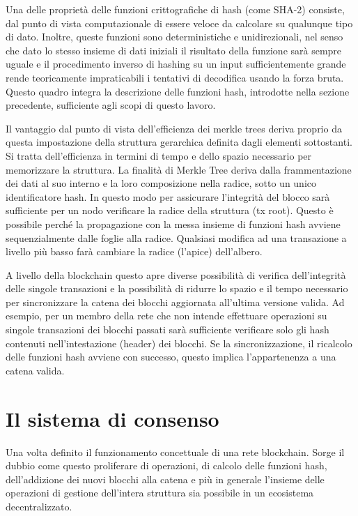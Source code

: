 Una delle proprietà delle funzioni crittografiche di hash (come SHA-2) consiste, dal punto di vista computazionale di essere veloce da calcolare su qualunque tipo di dato. Inoltre, queste funzioni sono deterministiche e unidirezionali, nel senso che dato lo stesso insieme di dati iniziali il risultato della funzione sarà sempre uguale e il procedimento inverso di hashing su un input sufficientemente grande rende teoricamente impraticabili i tentativi di decodifica usando la forza bruta. Questo quadro integra la descrizione delle funzioni hash, introdotte nella sezione precedente, sufficiente agli scopi di questo lavoro.
 
Il vantaggio dal punto di vista dell'efficienza dei merkle trees deriva proprio da questa impostazione della struttura gerarchica definita dagli elementi sottostanti. Si tratta dell'efficienza in termini di tempo e dello spazio necessario per memorizzare la struttura. La finalità di Merkle Tree deriva dalla frammentazione dei dati al suo interno e la loro composizione nella radice, sotto un unico identificatore hash. In questo modo per assicurare l'integrità del blocco sarà sufficiente per un nodo verificare la radice della struttura (tx root). Questo è possibile perché la propagazione con la messa insieme di funzioni hash avviene sequenzialmente dalle foglie alla radice. Qualsiasi modifica ad una transazione a livello più basso farà cambiare la radice (l'apice) dell'albero. 

A livello della blockchain questo apre diverse possibilità di verifica dell'integrità delle singole transazioni e la possibilità di ridurre lo spazio e il tempo necessario per sincronizzare la catena dei blocchi aggiornata all'ultima versione valida. Ad esempio, per un membro della rete che non intende effettuare operazioni su singole transazioni dei blocchi passati sarà sufficiente verificare solo gli hash contenuti nell'intestazione (header) dei blocchi. Se la sincronizzazione, il ricalcolo delle funzioni hash avviene con successo, questo implica l'appartenenza a una catena valida.


\section{Il sistema di consenso} %

Una volta definito il funzionamento concettuale di una rete blockchain. Sorge il dubbio come questo proliferare di operazioni, di calcolo delle funzioni hash, dell'addizione dei nuovi blocchi alla catena e più in generale l'insieme delle operazioni di gestione dell'intera struttura sia possibile in un ecosistema decentralizzato. 

